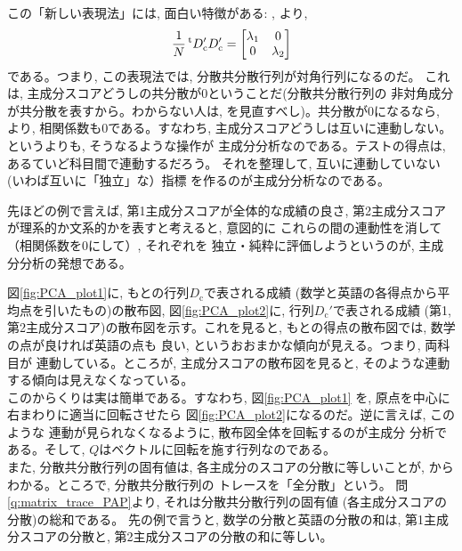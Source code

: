 この「新しい表現法」には, 面白い特徴がある: 
, より, 
\begin{eqnarray}
\frac{1}{N}\,^{\text t}D_{\text{c}}'D_{\text{c}}'=
\begin{bmatrix}
\lambda_1 & 0\\
0         & \lambda_2\\
\end{bmatrix}
\label{eq:tQsQ_diag8}\end{eqnarray}
である。つまり, この表現法では, 分散共分散行列が対角行列になるのだ。
これは, 主成分スコアどうしの共分散が0ということだ(分散共分散行列の
非対角成分が共分散を表すから。わからない人は, 
を見直すべし)。共分散が0になるなら, 
より, 相関係数も0である。すなわち, 
主成分スコアどうしは互いに連動しない。というよりも, そうなるような操作が
主成分分析なのである。テストの得点は, あるていど科目間で連動するだろう。
それを整理して, 互いに連動していない(いわば互いに「独立」な）指標
を作るのが主成分分析なのである。

先ほどの例で言えば, 第1主成分スコアが全体的な成績の良さ, 
第2主成分スコアが理系的か文系的かを表すと考えると, 意図的に
これらの間の連動性を消して（相関係数を0にして）, それぞれを
独立・純粋に評価しようというのが, 主成分分析の発想である。

図\ref{fig:PCA_plot1}に, もとの行列$D_{\text{c}}$で表される成績
(数学と英語の各得点から平均点を引いたもの)の散布図, 
図\ref{fig:PCA_plot2}に, 行列$D_{\text{c}}'$で表される成績
(第1, 第2主成分スコア)の散布図を示す。これを見ると, 
もとの得点の散布図では, 数学の点が良ければ英語の点も
良い, というおおまかな傾向が見える。つまり, 両科目が
連動している。ところが, 主成分スコアの散布図を見ると, 
そのような連動する傾向は見えなくなっている。\\

このからくりは実は簡単である。すなわち, 図\ref{fig:PCA_plot1}
を, 原点を中心に右まわりに適当に回転させたら
図\ref{fig:PCA_plot2}になるのだ。逆に言えば, このような
連動が見られなくなるように, 散布図全体を回転するのが主成分
分析である。そして, $Q$はベクトルに回転を施す行列なのである。\\

また, 分散共分散行列の固有値は, 各主成分のスコアの分散に等しいことが, 
からわかる。ところで, 分散共分散行列の
トレースを「全分散」という。
問\ref{q:matrix_trace_PAP}より, それは分散共分散行列の固有値
(各主成分スコアの分散)の総和である。
先の例で言うと, 数学の分散と英語の分散の和は, 第1主成分スコアの分散と, 
第2主成分スコアの分散の和に等しい。

